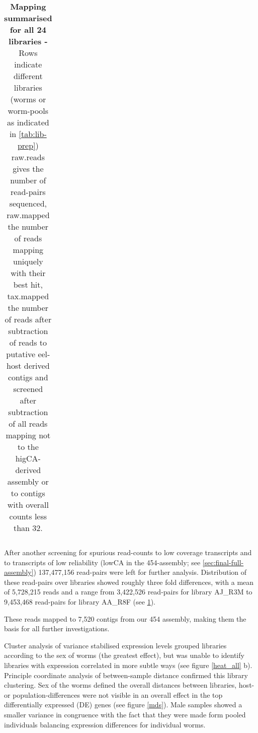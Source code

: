 \begin{table}[h]
\begin{center}
\begin{tabular}{llrrr}
   \hline
\end{tabular}
\caption[mapping Summary]{\textbf{Mapping summarised for all 24
    libraries -} Rows indicate different libraries (worms or
  worm-pools as indicated in \ref{tab:lib-prep}) raw.reads gives the
  number of read-pairs sequenced, raw.mapped the number of reads
  mapping uniquely with their best hit, tax.mapped the number of reads
  after subtraction of reads to putative eel-host derived contigs
  and screened after subtraction of all reads mapping not to the
  higCA-derived assembly or to contigs with overall counts less than
  32.}
\label{tab:read-clean}
\end{center}
\end{table}


After another screening for spurious read-counts to low coverage
transcripts and to transcripts of low reliability (lowCA in the
454-assembly; see \ref{sec:final-full-assembly}) 137,477,156
read-pairs were left for further analysis. Distribution of these
read-pairs over libraries showed roughly three fold differences, with a
mean of 5,728,215 reads and a range from 3,422,526 read-pairs for
library AJ\_R3M to 9,453,468 read-pairs for library AA\_R8F (see
\ref{tab:read-clean}).


\afterpage{\clearpage}

These reads mapped to 7,520 contigs from our 454 assembly, making them
the basis for all further investigations.

Cluster analysis of variance stabilised expression levels grouped
libraries according to the sex of worms (the greatest effect), but was
unable to identify libraries with expression correlated in more subtle
ways (see figure \ref{heat_all} b). Principle coordinate analysis of
between-sample distance confirmed this library clustering. Sex of the
worms defined the overall distances between libraries, host- or
population-differences were not visible in an overall effect in the
top differentially expressed (DE) genes (see figure \ref{mds}). Male
samples showed a smaller variance in congruence with the fact that
they were made form pooled individuals balancing expression
differences for individual worms.

